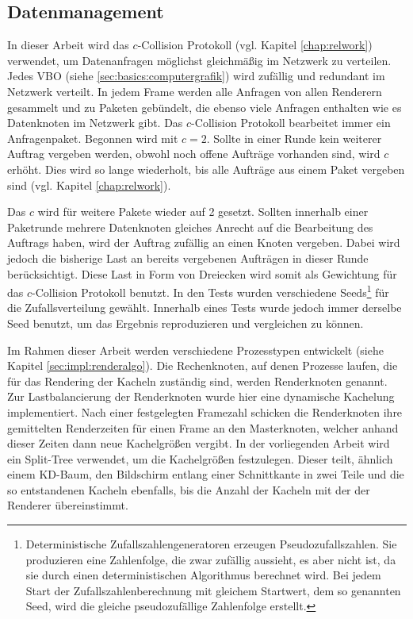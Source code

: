 \subsection{Datenmanagement}
\label{sec:basics:daten}
In dieser Arbeit wird das $c$-Collision Protokoll (vgl. Kapitel \ref{chap:relwork}) verwendet, um Datenanfragen möglichst gleichmäßig im Netzwerk zu verteilen. Jedes VBO (siehe \ref{sec:basics:computergrafik}) wird zufällig und redundant im Netzwerk verteilt. In jedem Frame werden alle Anfragen von allen Renderern gesammelt und zu Paketen gebündelt, die ebenso viele Anfragen enthalten wie es Datenknoten im Netzwerk gibt. Das $c$-Collision Protokoll bearbeitet immer ein Anfragenpaket. Begonnen wird mit $c = 2$. Sollte in einer Runde kein weiterer Auftrag vergeben werden, obwohl noch offene Aufträge vorhanden sind, wird $c$ erhöht. Dies wird so lange wiederholt, bis alle Aufträge aus einem Paket vergeben sind (vgl. Kapitel \ref{chap:relwork}).


Das $c$ wird für weitere Pakete wieder auf 2 gesetzt. Sollten innerhalb einer Paketrunde mehrere Datenknoten gleiches Anrecht auf die Bearbeitung des Auftrags haben, wird der Auftrag zufällig an einen Knoten vergeben. Dabei wird jedoch die bisherige Last an bereits vergebenen Aufträgen in dieser Runde berücksichtigt. Diese Last in Form von Dreiecken wird somit als Gewichtung für das $c$-Collision Protokoll benutzt. In den Tests wurden verschiedene Seeds\footnote{Deterministische Zufallszahlengeneratoren erzeugen Pseudozufallszahlen. Sie produzieren eine Zahlenfolge, die zwar zufällig aussieht, es aber nicht ist, da sie durch einen deterministischen Algorithmus berechnet wird. Bei jedem Start der Zufallszahlenberechnung mit gleichem Startwert, dem so genannten Seed, wird die gleiche pseudozufällige Zahlenfolge erstellt.} für die Zufallsverteilung gewählt. Innerhalb eines Tests wurde jedoch immer derselbe Seed benutzt, um das Ergebnis reproduzieren und vergleichen zu können.

\vspace{0.5cm}Im Rahmen dieser Arbeit werden verschiedene Prozesstypen entwickelt (siehe Kapitel \ref{sec:impl:renderalgo}). Die Rechenknoten, auf denen Prozesse laufen, die für das Rendering der Kacheln zuständig sind, werden Renderknoten genannt. Zur Lastbalancierung der Renderknoten wurde hier eine dynamische Kachelung implementiert. Nach einer festgelegten Framezahl schicken die Renderknoten ihre gemittelten Renderzeiten für einen Frame an den Masterknoten, welcher anhand dieser Zeiten dann neue Kachelgrößen vergibt. In der vorliegenden Arbeit wird ein Split-Tree verwendet, um die Kachelgrößen festzulegen. Dieser teilt, ähnlich einem KD-Baum, den Bildschirm entlang einer Schnittkante in zwei Teile und die so entstandenen Kacheln ebenfalls, bis die Anzahl der Kacheln mit der der Renderer übereinstimmt. 


